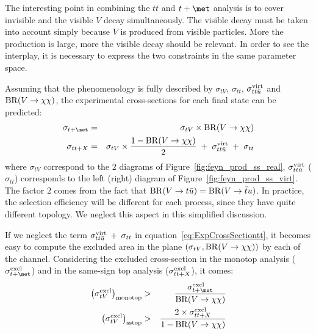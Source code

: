  The interesting point in combining the $tt$ and $t+\met$ analysis is to cover invisible and the visible $V$ decay simultaneously. The visible decay must 
 be taken into account simply because $V$ is produced from visible particles. More the production is large, more the visible decay should be relevant. 
 In order to see the interplay, it is necessary to express the two constraints in the same parameter space.

 Assuming that the phenomenology is fully described by $\sigma_{tV}$, $\sigma_{tt}$, $\sigma^{\rm{virt}}_{tt\bar{u}}$ and $\mathrm{BR}({V} \to {\chi\chi})$, 
 the experimental cross-sections for each final state can be predicted:
 \begin{eqnarray}
   \sigma_{t+\met} &=& \sigma_{tV} \times \BR{V}{\chi\chi} \label{eq:ExpCrossSectiont} \\
   \sigma_{tt+X}   &=& \sigma_{tV} \times \frac{1-\BR{V}{\chi\chi}}{2} \; + \; \sigma^{\rm{virt}}_{tt\bar{u}} \;+\; \sigma_{tt}    \label{eq:ExpCrossSectiontt}
 \end{eqnarray}
 where $\sigma_{tV}$ correspond to the $2$ diagrams of Figure~\ref{fig:feyn_prod_ss_real}, $\sigma^{\rm{virt}}_{tt\bar{u}}$ ($\sigma_{tt}$) 
 corresponds to the left (right) diagram of Figure~\ref{fig:feyn_prod_ss_virt}. The factor $2$ comes from the fact that $\mathrm{BR}({V} \to {t\bar{u}}) = \mathrm{BR}({V} \to {\bar{t}u})$. 
 In practice, the selection efficiency will be different for each process, since they have quite different topology. We neglect this aspect in this simplified discussion.

 If we neglect the term $\sigma^{\rm{virt}}_{tt\bar{u}} \:+\: \sigma_{tt}$ in equation~\eqref{eq:ExpCrossSectiontt}, it becomes easy to compute the excluded area in
 the plane $(\sigma_{tV}, \mathrm{BR}({V} \to {\chi\chi}))$ by each of the channel. Considering the excluded cross-section in the monotop analysis ($\sigma^{\rm{excl}}_{t+\met}$) 
 and in the same-sign top analysis ($\sigma^{\rm{excl}}_{tt+X}$), it comes:
 \begin{eqnarray}
  \label{eq:ExclusionArea}
  \left( \sigma^{\rm{excl}}_{tV} \right)_{\rm{monotop}} &>& \frac{\sigma^{\rm{excl}}_{t+\met}}{\BR{V}{\chi\chi}} \label{eq:ExclusionArea1} \\
  \left( \sigma^{\rm{excl}}_{tV} \right)_{\rm{sstop}}   &>& \frac{2\times\sigma^{\rm{excl}}_{tt+X}}{1-\BR{V}{\chi\chi}} \label{eq:ExclusionArea2}
 \end{eqnarray}

